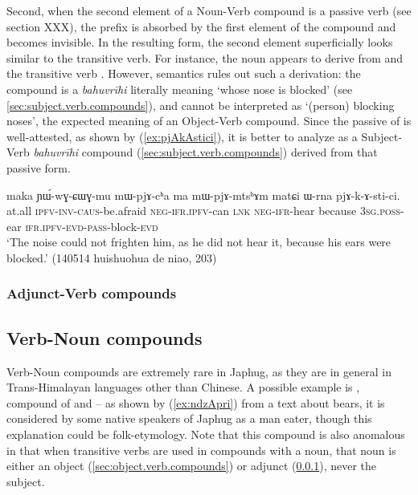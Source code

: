 Second, when the second element of a Noun-Verb compound is a  passive verb (see section XXX), the  prefix is absorbed by the first element of the compound and becomes invisible. In the resulting form, the second element superficially looks similar to the transitive verb. For instance, the noun  appears to derive from  and the transitive verb  . However, semantics rules out such a derivation: the compound is a \textit{bahuvrīhi} literally meaning `whose nose is blocked' (see \ref{sec:subject.verb.compounds}), and cannot be interpreted as `(person) blocking noses', the expected meaning of an Object-Verb compound. Since the passive  of   is well-attested, as shown by (\ref{ex:pjAkAstici}), it is better to analyze  as a Subject-Verb \textit{bahuvrīhi} compound (\ref{sec:subject.verb.compounds}) derived from that passive form.

\begin{exe}
\ex \label{ex:pjAkAstici}
\gll maka ɲɯ́-wɣ-ɕɯɣ-mu mɯ-pjɤ-cʰa ma mɯ-pjɤ-mtsʰɤm matɕi ɯ-rna pjɤ-k-ɤ-sti-ci. \\
at.all \textsc{ipfv}-\textsc{inv}-\textsc{caus}-be.afraid \textsc{neg}-\textsc{ifr.ipfv}-can \textsc{lnk} \textsc{neg}-\textsc{ifr}-hear because \textsc{3sg.poss}-ear \textsc{ifr.ipfv}-\textsc{evd}-\textsc{pass}-block-\textsc{evd} \\
\glt `The noise could not frighten him, as he did not hear it, because his ears were blocked.' (140514 huishuohua de niao, 203)
\end{exe}

\subsubsection{Adjunct-Verb compounds} \label{sec:adjunct.verb.compounds}
\subsection{Verb-Noun compounds} \label{sec.v.n.compounds}
Verb-Noun compounds are extremely rare in Japhug, as they are in general in Trans-Himalayan languages other than Chinese.  A possible example is , compound of  and  -- as shown by (\ref{ex:ndzApri}) from a text about bears, it is considered by some native speakers of Japhug as a man eater, though this explanation could be folk-etymology. Note that this compound is also anomalous in that when transitive verbs are used in compounds with a noun, that noun is either an object (\ref{sec:object.verb.compounds}) or adjunct (\ref{sec:adjunct.verb.compounds}), never the subject.

